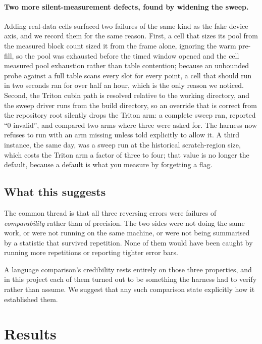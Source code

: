 \documentclass[11pt]{article}
\begin{document}
\paragraph{Two more silent-measurement defects, found by widening the sweep.}
Adding real-data cells surfaced two failures of the same kind as the fake
device axis, and we record them for the same reason. First, a cell that sizes
its pool from the measured block count sized it from the frame alone, ignoring
the warm pre-fill, so the pool was exhausted before the timed window opened and
the cell measured pool exhaustion rather than table contention; because an
unbounded probe against a full table scans every slot for every point, a cell
that should run in two seconds ran for over half an hour, which is the only
reason we noticed. Second, the Triton cubin path is resolved relative to the
working directory, and the sweep driver runs from the build directory, so an
override that is correct from the repository root silently drops the Triton
arm: a complete sweep ran, reported ``0 invalid'', and compared two arms where
three were asked for. The harness now refuses to run with an arm missing unless
told explicitly to allow it. A third instance, the same day, was a sweep run at
the historical scratch-region size, which costs the Triton arm a factor of
three to four; that value is no longer the default, because a default is what
you measure by forgetting a flag.

\subsection{What this suggests}

The common thread is that all three reversing errors were failures of
\emph{comparability} rather than of precision. The two sides were not doing the
same work, or were not running on the same machine, or were not being summarised
by a statistic that survived repetition. None of them would have been caught by
running more repetitions or reporting tighter error bars.

A language comparison's credibility rests entirely on those three properties,
and in this project each of them turned out to be something the harness had to
verify rather than assume. We suggest that any such comparison state explicitly
how it established them.

\section{Results}
\label{sec:results}
\end{document}
